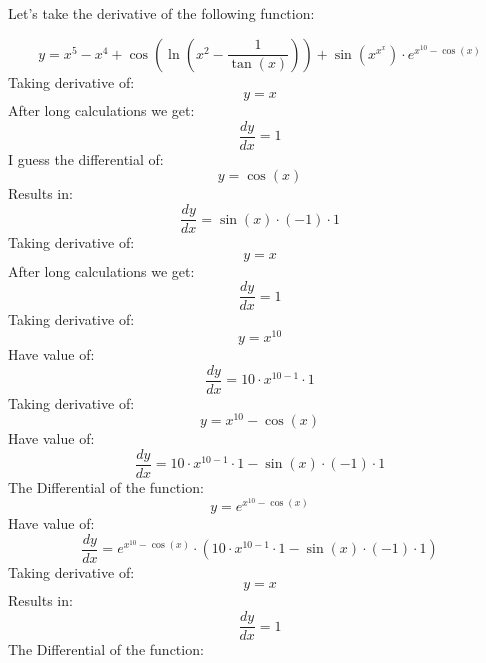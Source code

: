 \documentclass{article}
\begin{document}
\begin{center}
{\Large Let's take the derivative of the following function:}

\begin{dmath}
 y = x^{5}-x^{4}+\cos (\ln (x^{2}-\dfrac{1}{\tan (x)}))+\sin (x^{x^{x}})\cdot e^{x^{10}-\cos (x)}
\end{dmath}
Taking derivative of:
\begin{dmath}
 y = x
\end{dmath}
After long calculations we get:
\begin{dmath}
 \frac{dy}{dx} = 1
\end{dmath}
I guess the differential of:
\begin{dmath}
 y = \cos (x)
\end{dmath}
Results in:
\begin{dmath}
 \frac{dy}{dx} = \sin (x)\cdot (-1)\cdot 1
\end{dmath}
Taking derivative of:
\begin{dmath}
 y = x
\end{dmath}
After long calculations we get:
\begin{dmath}
 \frac{dy}{dx} = 1
\end{dmath}
Taking derivative of:
\begin{dmath}
 y = x^{10}
\end{dmath}
Have value of:
\begin{dmath}
 \frac{dy}{dx} = 10\cdot x^{10-1}\cdot 1
\end{dmath}
Taking derivative of:
\begin{dmath}
 y = x^{10}-\cos (x)
\end{dmath}
Have value of:
\begin{dmath}
 \frac{dy}{dx} = 10\cdot x^{10-1}\cdot 1-\sin (x)\cdot (-1)\cdot 1
\end{dmath}
The Differential of the function:
\begin{dmath}
 y = e^{x^{10}-\cos (x)}
\end{dmath}
Have value of:
\begin{dmath}
 \frac{dy}{dx} = e^{x^{10}-\cos (x)}\cdot (10\cdot x^{10-1}\cdot 1-\sin (x)\cdot (-1)\cdot 1)
\end{dmath}
Taking derivative of:
\begin{dmath}
 y = x
\end{dmath}
Results in:
\begin{dmath}
 \frac{dy}{dx} = 1
\end{dmath}
The Differential of the function:
\begin{dmath}

\end{dmath}
\end{center}
\end{document}
